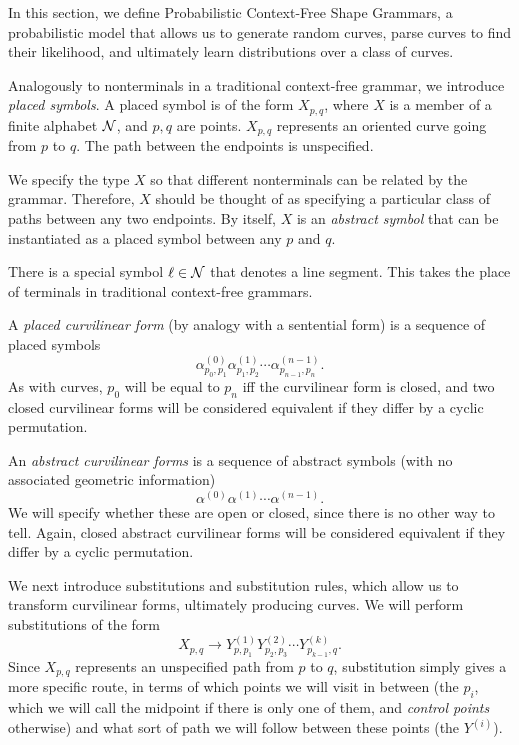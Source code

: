 

In this section, we define Probabilistic Context-Free Shape Grammars,
a probabilistic model that allows us to generate random curves, parse
curves to find their likelihood, and ultimately learn distributions
over a class of curves.

Analogously to nonterminals in a traditional context-free grammar, we
introduce {\em placed symbols}. A placed symbol is of the form
$X_{p,q}$, where $X$ is a member of a finite alphabet ${\mathcal N}$, and
$p,q$ are points. $X_{p,q}$ represents an oriented curve going from
$p$ to $q$. The path between the endpoints is unspecified.

We specify the type $X$ so that different nonterminals can be related
by the grammar. Therefore, $X$ should be thought of as specifying a
particular class of paths between any two endpoints. By itself, $X$ is
an {\em abstract symbol} that can be instantiated as a placed symbol
between any $p$ and $q$.

There is a special symbol $\ell\in {\mathcal N}$ that denotes a line
segment. This takes the place of terminals in traditional context-free
grammars.

\begin{defn}
A {\em placed curvilinear form} (by analogy with a sentential form) is
a sequence of placed symbols
$$ \alpha^{(0)}_{p_0,p_1} \alpha^{(1)}_{p_1,p_2} \cdots
\alpha^{(n-1)}_{p_{n-1},{p_n}}.$$ As with curves, $p_0$ will be equal
to $p_n$ iff the curvilinear form is closed, and two closed curvilinear
forms will be considered equivalent if they differ by a cyclic
permutation.

An {\em abstract curvilinear forms} is a sequence of abstract symbols
(with no associated geometric information)
$$ \alpha^{(0)} \alpha^{(1)} \cdots \alpha^{(n-1)}.$$ We will specify
whether these are open or closed, since there is no other way to
tell. Again, closed abstract curvilinear forms will be considered
equivalent if they differ by a cyclic permutation.
\end{defn}

We next introduce substitutions and substitution rules, which allow us
to transform curvilinear forms, ultimately producing curves. We will
perform substitutions of the form
$$ X_{p,q} \to Y^{(1)}_{p,p_1} Y^{(2)}_{p_2,p_3} \cdots
Y^{(k)}_{p_{k-1},q}.$$ Since $X_{p,q}$ represents an unspecified path
from $p$ to $q$, substitution simply gives a more specific route, in
terms of which points we will visit in between (the $p_i$, which we
will call the midpoint if there is only one of them, and {\em control
  points} otherwise) and what sort of path we will follow between
these points (the $Y^{(i)}$).

